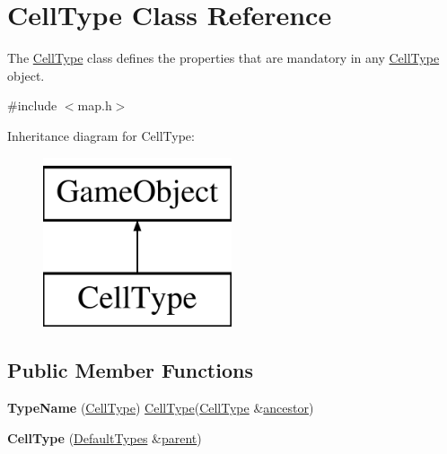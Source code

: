 \hypertarget{class_cell_type}{\section{\-Cell\-Type \-Class \-Reference}
\label{class_cell_type}
}


\-The \hyperlink{class_cell_type}{\-Cell\-Type} class defines the properties that are mandatory in any \hyperlink{class_cell_type}{\-Cell\-Type} object.  




{\ttfamily \#include $<$map.\-h$>$}

\-Inheritance diagram for \-Cell\-Type\-:\begin{figure}[H]
\begin{center}
\leavevmode
\includegraphics[height=5.000000cm]{class_cell_type}
\end{center}
\end{figure}
\subsection*{\-Public \-Member \-Functions}
\begin{DoxyCompactItemize}
\item 
\hypertarget{class_cell_type_ac32b17c3848b61df90410d176855ebee}{{\bfseries \-Type\-Name} (\hyperlink{class_cell_type}{\-Cell\-Type}) \hyperlink{class_cell_type}{\-Cell\-Type}(\hyperlink{class_cell_type}{\-Cell\-Type} \&\hyperlink{class_inheritable_object_ac87a3c55ca4be252c527a29fe162bb15}{ancestor})}\label{class_cell_type_ac32b17c3848b61df90410d176855ebee}

\item 
\hypertarget{class_cell_type_a4af772be829a307264a5392655b8bbc1}{{\bfseries \-Cell\-Type} (\hyperlink{class_default_types}{\-Default\-Types} \&\hyperlink{class_game_object_af3deaf39cde23c189765634e32e95bb4}{parent})}\label{class_cell_type_a4af772be829a307264a5392655b8bbc1}

\end{DoxyCompactItemize}


